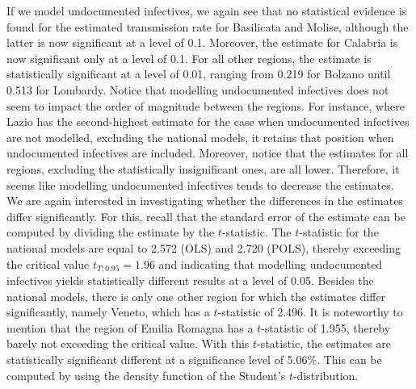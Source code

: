 \documentclass[12pt]{article}
\begin{document}
    If we model undocumented infectives, we again see that no statistical evidence is found for the estimated transmission rate for Basilicata and Molise, although the latter is now significant at a level of 0.1. Moreover, the estimate for Calabria is now significant only at a level of 0.1. For all other regions, the estimate is statistically significant at a level of 0.01, ranging from 0.219 for Bolzano until 0.513 for Lombardy. Notice that modelling undocumented infectives does not seem to impact the order of magnitude between the regions. For instance, where Lazio has the second-highest estimate for the case when undocumented infectives are not modelled, excluding the national models, it retains that position when undocumented infectives are included. Moreover, notice that the estimates for all regions, excluding the statistically insignificant ones, are all lower. Therefore, it seems like modelling undocumented infectives tends to decrease the estimates. \\

    We are again interested in investigating whether the differences in the estimates differ significantly. For this, recall that the standard error of the estimate can be computed by dividing the estimate by the $t$-statistic. The $t$-statistic for the national models are equal to 2.572 (OLS) and 2.720 (POLS), thereby exceeding the critical value $t_{T;0.95} = 1.96$ and indicating that modelling undocumented infectives yields statistically different results at a level of 0.05. Besides the national models, there is only one other region for which the estimates differ significantly, namely Veneto, which has a $t$-statistic of 2.496. It is noteworthy to mention that the region of Emilia Romagna has a $t$-statistic of 1.955, thereby barely not exceeding the critical value. With this $t$-statistic, the estimates are statistically significant different at a significance level of 5.06\%. This can be computed by using the density function of the Student's $t$-distribution. \\
\end{document}
